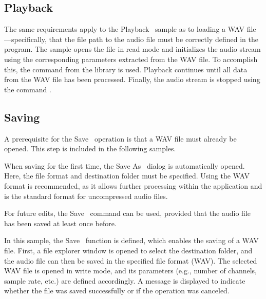 \subsection{Playback}

The same requirements apply to the \glqq Playback\grqq~ sample as to loading a WAV file—specifically, that the file path to the audio file must be correctly defined in the program.  
The sample opens the file  in read mode and initializes the audio stream using the corresponding parameters extracted from the WAV file.  
To accomplish this, the  command from the  library is used.  
Playback continues until all data from the WAV file has been processed.  
Finally, the audio stream is stopped using the command .

\subsection{Saving}

A prerequisite for the \glqq Save\grqq~ operation is that a WAV file must already be opened.  
This step is included in the following samples.  

When saving for the first time, the \glqq Save As\grqq~ dialog is automatically opened.  
Here, the file format and destination folder must be specified.  
Using the WAV format is recommended, as it allows further processing within the application and is the standard format for uncompressed audio files.

For future edits, the \glqq Save\grqq~ command can be used, provided that the audio file has been saved at least once before.

\begin{code}[!htp]
	\caption{Save a new wave file using a file dialog with guizero and wave} 
	\label{Code:Python:File:saveWaveFileDialog}
\end{code}    

In this sample, the \glqq Save\grqq~ function is defined, which enables the saving of a WAV file.  
First, a file explorer window is opened to select the destination folder, and the audio file can then be saved in the specified file format (WAV).  
The selected WAV file is opened in write mode, and its parameters (e.g., number of channels, sample rate, etc.) are defined accordingly.  
A message is displayed to indicate whether the file was saved successfully or if the operation was canceled.

